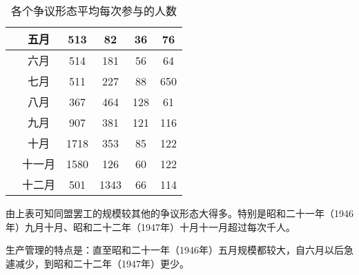 \documentclass[a4paper,12pt]{article}
\begin{document}
\begin{table}
\begin{tabular}{|c|c|c|c|c|c|}
    \hline
                           & 五月 & 513      & 82       & 36       & 76       \\ 
    \hline
                           & 六月 & 514      & 181      & 56       & 64       \\ 
    \hline
                           & 七月 & 511      & 227      & 88       & 650      \\ 
    \hline
                           & 八月 & 367      & 464      & 128      & 61       \\ 
    \hline
                           & 九月 & 907      & 381      & 121      & 116      \\ 
    \hline
                           & 十月 & 1718     & 353      & 85       & 122      \\
    \hline
                         & 十一月 & 1580     & 126      & 60       & 122      \\ 
    \hline
                         & 十二月 & 501      & 1343     & 66       & 114      \\ 
    \hline
  \end{tabular}
  \caption{各个争议形态平均每次参与的人数}
\end{table}

由上表可知同盟罢工的规模较其他的争议形态大得多。特别是昭和二十一年（1946年）九月十月、昭和二十二年（1947年）十月十一月超过每次千人。

生产管理的特点是：直至昭和二十一年（1946年）五月规模都较大，自六月以后急遽减少，到昭和二十二年（1947年）更少。
\end{document}
